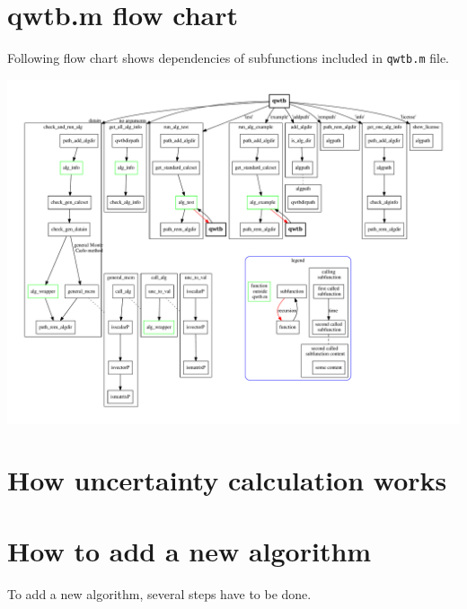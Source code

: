 \documentclass[12pt,a4paper,oneside]{report} %
\begin{document}

\section{qwtb.m flow chart} %
Following flow chart shows dependencies of subfunctions included in {\tt qwtb.m} file.
\begin{center}
        \includegraphics[width=1.2\textwidth, angle=90]{sources/inner_dependencies.pdf}
\end{center}


\section{How uncertainty calculation works} %


\section{How to add a new algorithm} %
To add a new algorithm, several steps have to be done.
\end{document}
